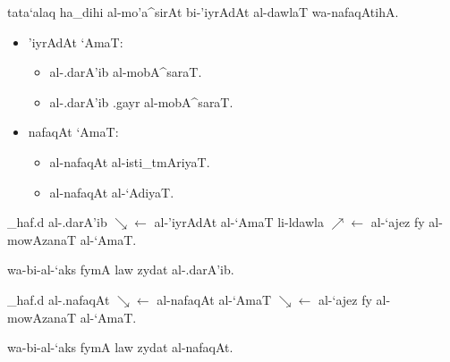 tata`alaq ha_dihi al-mo'a^sirAt bi-'iyrAdAt al-dawlaT wa-nafaqAtihA.

\begin{itemize}
    \item 'iyrAdAt `AmaT:
        \begin{itemize}
            \item al-.darA'ib al-mobA^saraT.
            \item al-.darA'ib .gayr al-mobA^saraT.
        \end{itemize}
    
    \item nafaqAt `AmaT:
        \begin{itemize}
            \item al-nafaqAt al-isti_tmAriyaT.
            \item al-nafaqAt al-`AdiyaT.
        \end{itemize}
\end{itemize}

_haf.d al-.darA'ib
$\searrow\leftarrow$ al-'iyrAdAt al-`AmaT li-ldawla
$\nearrow\leftarrow$ al-`ajez fy al-mowAzanaT al-`AmaT.

wa-bi-al-`aks fymA law zydat al-.darA'ib.

\vspace{4pt}

_haf.d al-.nafaqAt
$\searrow\leftarrow$ al-nafaqAt al-`AmaT
$\searrow\leftarrow$ al-`ajez fy al-mowAzanaT al-`AmaT.

wa-bi-al-`aks fymA law zydat al-nafaqAt.
